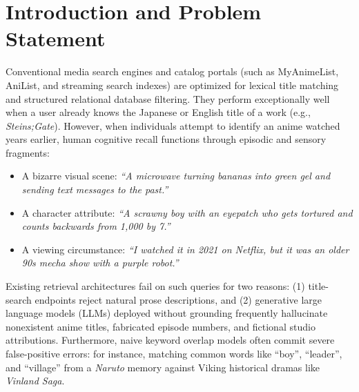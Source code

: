 \documentclass[11pt,a4paper]{article}
\begin{document}
\section{Introduction and Problem Statement}
\label{sec:intro}

Conventional media search engines and catalog portals (such as MyAnimeList, AniList, and streaming search indexes) are optimized for lexical title matching and structured relational database filtering. They perform exceptionally well when a user already knows the Japanese or English title of a work (e.g., \textit{Steins;Gate}). However, when individuals attempt to identify an anime watched years earlier, human cognitive recall functions through episodic and sensory fragments:
\begin{itemize}[noitemsep]
    \item A bizarre visual scene: \textit{``A microwave turning bananas into green gel and sending text messages to the past.''}
    \item A character attribute: \textit{``A scrawny boy with an eyepatch who gets tortured and counts backwards from 1,000 by 7.''}
    \item A viewing circumstance: \textit{``I watched it in 2021 on Netflix, but it was an older 90s mecha show with a purple robot.''}
\end{itemize}

Existing retrieval architectures fail on such queries for two reasons: (1) title-search endpoints reject natural prose descriptions, and (2) generative large language models (LLMs) deployed without grounding frequently hallucinate nonexistent anime titles, fabricated episode numbers, and fictional studio attributions. Furthermore, naive keyword overlap models often commit severe false-positive errors: for instance, matching common words like ``boy'', ``leader'', and ``village'' from a \textit{Naruto} memory against Viking historical dramas like \textit{Vinland Saga}.
\end{document}

